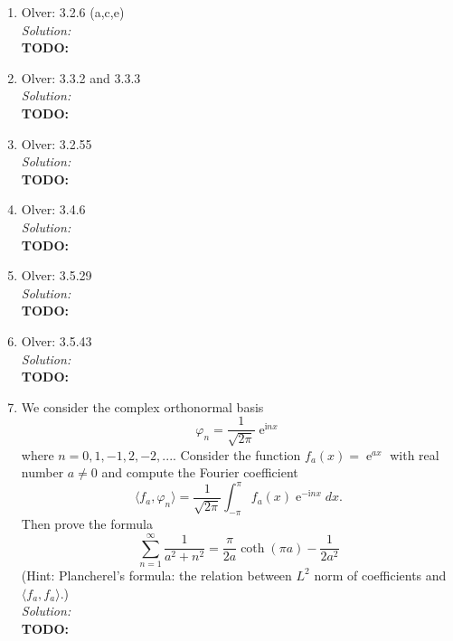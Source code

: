 \documentclass[10pt]{amsart}
\newcommand{\I}{\mathrm{i}}
\DeclareMathOperator{\E}{e}
\theoremstyle{nonumberplain}
\begin{document}
\begin{enumerate}[label={\bf {\arabic*}:}]
\item Olver: 3.2.6 (a,c,e) \\

\noindent
\textit{Solution:} \\
\textbf{TODO:}

\newpage


\item Olver: 3.3.2 and 3.3.3 \\

\noindent
\textit{Solution:} \\
\textbf{TODO:}

\newpage


\item Olver: 3.2.55 \\

\noindent
\textit{Solution:} \\
\textbf{TODO:}

\newpage


\item Olver: 3.4.6 \\

\noindent
\textit{Solution:} \\
\textbf{TODO:}

\newpage


\item Olver: 3.5.29 \\

\noindent
\textit{Solution:} \\
\textbf{TODO:}

\newpage


\item Olver: 3.5.43 \\

\noindent
\textit{Solution:} \\
\textbf{TODO:}

\newpage

\item We consider the complex orthonormal basis
$$
\varphi_n = \frac 1 {\sqrt{2 \pi}} \E^{\I n x}
$$
where $n = 0, 1, -1, 2, -2, ...$.
Consider the function $f_a(x) = \E^{ax}$ with real number $a \neq 0$ and compute the Fourier coefficient
$$
\langle f_a, \varphi_n \rangle = \frac 1 {\sqrt{2 \pi}} \int_{-\pi}^{\pi} f_a(x) \E^{- \I n x} dx.
$$
Then prove the formula
$$
\sum_{n = 1}^\infty \frac {1}{a^2 + n^2} = \frac \pi {2a} \coth (\pi a)  - \frac 1 {2a^2}
$$
(Hint: Plancherel’s formula: the relation between $L^2$ norm of coefficients and $\langle f_a, f_a \rangle$.)
\\

\noindent
\textit{Solution:} \\
\textbf{TODO: }
\end{enumerate}
\end{document}
